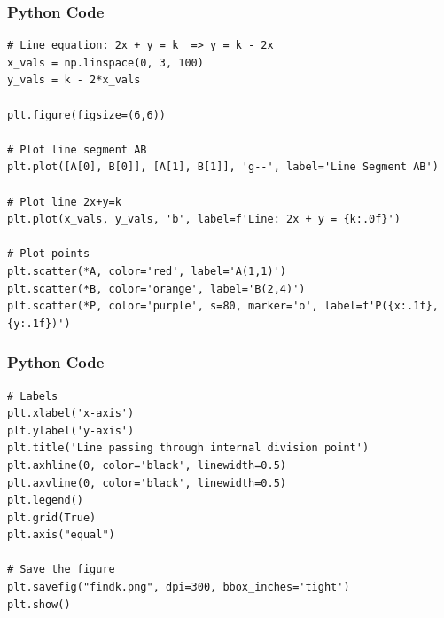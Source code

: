 \documentclass{beamer}
\begin{document}
 \begin{frame}[fragile]
\frametitle{Python Code }
\begin{lstlisting}
# Line equation: 2x + y = k  => y = k - 2x
x_vals = np.linspace(0, 3, 100)
y_vals = k - 2*x_vals

plt.figure(figsize=(6,6))

# Plot line segment AB
plt.plot([A[0], B[0]], [A[1], B[1]], 'g--', label='Line Segment AB')

# Plot line 2x+y=k
plt.plot(x_vals, y_vals, 'b', label=f'Line: 2x + y = {k:.0f}')

# Plot points
plt.scatter(*A, color='red', label='A(1,1)')
plt.scatter(*B, color='orange', label='B(2,4)')
plt.scatter(*P, color='purple', s=80, marker='o', label=f'P({x:.1f},{y:.1f})')
\end{lstlisting}
\end{frame}

 \begin{frame}[fragile]
\frametitle{Python Code }
\begin{lstlisting}
# Labels
plt.xlabel('x-axis')
plt.ylabel('y-axis')
plt.title('Line passing through internal division point')
plt.axhline(0, color='black', linewidth=0.5)
plt.axvline(0, color='black', linewidth=0.5)
plt.legend()
plt.grid(True)
plt.axis("equal")

# Save the figure
plt.savefig("findk.png", dpi=300, bbox_inches='tight')
plt.show()
\end{lstlisting}
\end{frame}
\end{document}
